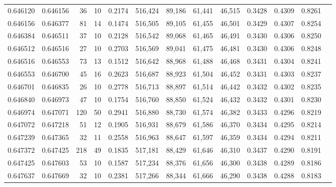 \begin{tabular}{rrrrrrrrrrrrr}
0.646120 & 0.646156 &    36 &  10 &                                     0.2174 & 516,424 &  89,186 &  61,441 &  46,515 & 0.3428 & 0.4309 & 0.8261 \\
0.646156 & 0.646377 &    81 &  14 &                                     0.1474 & 516,505 &  89,105 &  61,455 &  46,501 & 0.3429 & 0.4307 & 0.8254 \\
0.646384 & 0.646511 &    37 &  10 &                                     0.2128 & 516,542 &  89,068 &  61,465 &  46,491 & 0.3430 & 0.4306 & 0.8250 \\
0.646512 & 0.646516 &    27 &  10 &                                     0.2703 & 516,569 &  89,041 &  61,475 &  46,481 & 0.3430 & 0.4306 & 0.8248 \\
0.646516 & 0.646553 &    73 &  13 &                                     0.1512 & 516,642 &  88,968 &  61,488 &  46,468 & 0.3431 & 0.4304 & 0.8241 \\
0.646553 & 0.646700 &    45 &  16 &                                     0.2623 & 516,687 &  88,923 &  61,504 &  46,452 & 0.3431 & 0.4303 & 0.8237 \\
0.646701 & 0.646835 &    26 &  10 &                                     0.2778 & 516,713 &  88,897 &  61,514 &  46,442 & 0.3432 & 0.4302 & 0.8235 \\
0.646840 & 0.646973 &    47 &  10 &                                     0.1754 & 516,760 &  88,850 &  61,524 &  46,432 & 0.3432 & 0.4301 & 0.8230 \\
0.646974 & 0.647071 &   120 &  50 &                                     0.2941 & 516,880 &  88,730 &  61,574 &  46,382 & 0.3433 & 0.4296 & 0.8219 \\
0.647072 & 0.647218 &    51 &  12 &                                     0.1905 & 516,931 &  88,679 &  61,586 &  46,370 & 0.3434 & 0.4295 & 0.8214 \\
0.647239 & 0.647365 &    32 &  11 &                                     0.2558 & 516,963 &  88,647 &  61,597 &  46,359 & 0.3434 & 0.4294 & 0.8211 \\
0.647372 & 0.647425 &   218 &  49 &                                     0.1835 & 517,181 &  88,429 &  61,646 &  46,310 & 0.3437 & 0.4290 & 0.8191 \\
0.647425 & 0.647603 &    53 &  10 &                                     0.1587 & 517,234 &  88,376 &  61,656 &  46,300 & 0.3438 & 0.4289 & 0.8186 \\
0.647637 & 0.647669 &    32 &  10 &                                     0.2381 & 517,266 &  88,344 &  61,666 &  46,290 & 0.3438 & 0.4288 & 0.8183 \\

\end{tabular}
